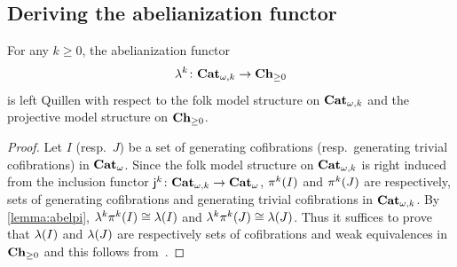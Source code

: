 \subsection{Deriving the abelianization functor}\label{subsec:abelderiv}
\begin{proposition}\label{prop:abelquillen}
  For any $k \geq 0$, the abelianization functor
  \[
    \mathsf{\mathsf{\lambda}}^{k} \colon \mathbf{Cat}_{\omega,k} \to \mathbf{Ch}_{\geq 0}
  \]
  is left Quillen with respect to the folk model structure on
  $\mathbf{Cat}_{\omega,k}$ and the projective model structure on $\mathbf{Ch}_{\geq 0}$.
\end{proposition}
\begin{proof}
   Let $I$ (resp.\ $J$) be a set of generating cofibrations (resp.\ generating
  trivial cofibrations) in $\mathbf{Cat}_{\omega}$. Since the folk model structure on
  $\mathbf{Cat}_{\omega,k}$ is right induced from
  the inclusion functor $\mathsf{j}_{}^{k} \colon \mathbf{Cat}_{\omega,k} \to \mathbf{Cat}_{\omega}$,
  $\mathsf{\pi}_{}^{k}(I)$ and $\mathsf{\pi}_{}^{k}(J)$ are respectively, sets of
  generating cofibrations and generating trivial cofibrations in
  $\mathbf{Cat}_{\omega,k}$. By \cref{lemma:abelpi}, $\mathsf{\mathsf{\lambda}}^{k}\mathsf{\pi}_{}^{k}(I)\cong
  \mathsf{\lambda}(I)$ and  $\mathsf{\mathsf{\lambda}}^{k}\mathsf{\pi}_{}^{k}(J)\cong \mathsf{\lambda}(J)$. Thus it
  suffices to prove that $\mathsf{\lambda} (I)$ and $\mathsf{\lambda} (J)$ are respectively
  sets of cofibrations and weak equivalences in $\mathbf{Ch}_{\geq 0}$ and this follows
  from~\cite[Theorem 22.2.7]{abgmmm:polybk}. 
\end{proof}

